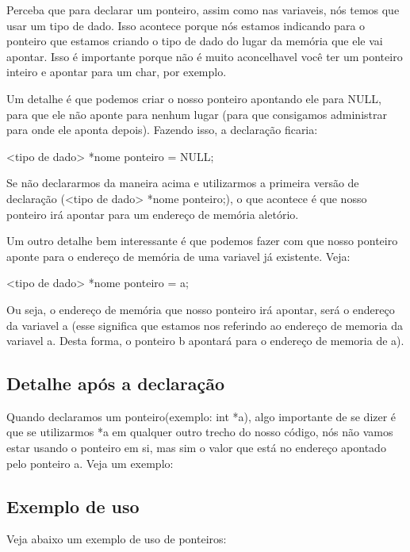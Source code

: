 \documentclass{report}
\begin{document}
	Perceba que para declarar um ponteiro, assim como nas variaveis, nós temos que usar um tipo de dado. Isso acontece porque nós estamos indicando para o ponteiro que estamos criando o tipo de dado do lugar da memória que ele vai apontar. Isso é importante porque não é muito aconcelhavel você ter um ponteiro inteiro e apontar para um char, por exemplo.
	
	Um detalhe é que podemos criar o nosso ponteiro apontando ele para NULL, para que ele não aponte para nenhum lugar (para que consigamos administrar para onde ele aponta depois). Fazendo isso, a declaração ficaria:
	
	\begin{LARGE}
		\begin{center}
			<tipo de dado> *nome ponteiro = NULL;
		\end{center}
	\end{LARGE}
	
	Se não declararmos da maneira acima e utilizarmos a primeira versão de declaração (<tipo de dado> *nome ponteiro;), o que acontece é que nosso ponteiro irá apontar para um endereço de memória aletório.
	
	Um outro detalhe bem interessante é que podemos fazer com que nosso ponteiro aponte para o endereço de memória de uma variavel já existente. Veja:
	
	\begin{LARGE}
		\begin{center}
			<tipo de dado> *nome ponteiro = a;
		\end{center}
	\end{LARGE}
	
	
	Ou seja, o endereço de memória que nosso ponteiro irá apontar, será o endereço da variavel a (esse  significa que estamos nos referindo ao endereço de memoria da variavel a. Desta forma, o ponteiro b apontará para o endereço de memoria de a).
	
	\subsection{Detalhe após a declaração}
	
	Quando declaramos um ponteiro(exemplo: int *a), algo importante de se dizer é que se utilizarmos *a em qualquer outro trecho do nosso código, nós não vamos estar usando o ponteiro em si, mas sim o valor que está no endereço apontado pelo ponteiro a. Veja um exemplo:
	
	
	\subsection{Exemplo de uso}
	Veja abaixo um exemplo de uso de ponteiros:
	
\end{document}
